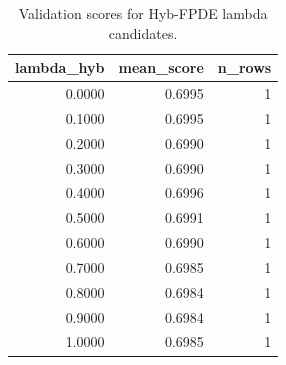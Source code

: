 \begin{table}[t]
\caption{Validation scores for Hyb-FPDE lambda candidates.}
\label{tab:lambda_distribution_computed}
\centering
\begin{tabular}{rrr}
\toprule
lambda\_hyb & mean\_score & n\_rows \\
\midrule
0.0000 & 0.6995 & 1 \\
0.1000 & 0.6995 & 1 \\
0.2000 & 0.6990 & 1 \\
0.3000 & 0.6990 & 1 \\
0.4000 & 0.6996 & 1 \\
0.5000 & 0.6991 & 1 \\
0.6000 & 0.6990 & 1 \\
0.7000 & 0.6985 & 1 \\
0.8000 & 0.6984 & 1 \\
0.9000 & 0.6984 & 1 \\
1.0000 & 0.6985 & 1 \\
\bottomrule
\end{tabular}

\end{table}
